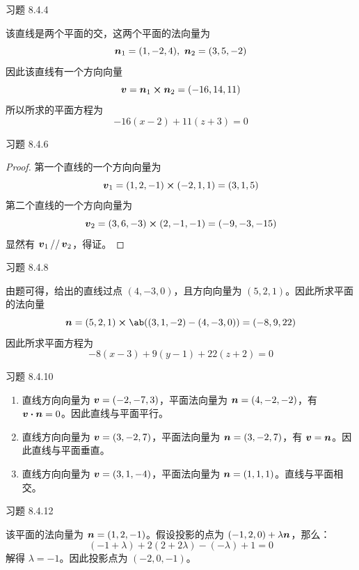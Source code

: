 \begin{problem}
    习题 8.4.4
    \begin{solution}
        该直线是两个平面的交，这两个平面的法向量为
        $$
        \boldsymbol{n}_1 = (1, -2, 4),\ \boldsymbol{n}_2 = (3, 5, -2)
        $$
        因此该直线有一个方向向量
        $$
        \vect{v} = \vect{n}_1 \cp \vect{n}_2 = (-16, 14, 11)
        $$
        所以所求的平面方程为
        $$
        -16 (x - 2) + 11 (z + 3) = 0
        $$
    \end{solution}
\end{problem}

\begin{problem}
    习题 8.4.6
    \begin{proof}
        第一个直线的一个方向向量为
        $$
        \vect{v}_1 = (1, 2, -1) \cp (-2, 1, 1) = (3, 1, 5)
        $$
        第二个直线的一个方向向量为
        $$
        \vect{v}_2 = (3, 6, -3) \cp (2, -1, -1) = (-9, -3, -15)
        $$
        显然有 $\boldsymbol{v}_1 \operatorname{//} \boldsymbol{v}_2$，得证。
    \end{proof}
\end{problem}

\begin{problem}
    习题 8.4.8
    \begin{solution}
        由题可得，给出的直线过点 $(4, -3, 0)$，且方向向量为 $(5, 2, 1)$。因此所求平面的法向量
        $$
        \vect{n} = (5, 2, 1) \cp \ab((3, 1, -2) - (4, -3, 0)) = (-8, 9, 22)
        $$
        因此所求平面方程为
        $$
        -8 (x - 3) + 9 (y - 1) + 22 (z + 2) = 0
        $$
    \end{solution}
\end{problem}

\begin{problem}
    习题 8.4.10
    \begin{solution}
        \begin{enumerate}
            \item[\textbf{1)}] 直线方向向量为 $\boldsymbol{v} = (-2, -7, 3)$，平面法向量为 $\boldsymbol{n} = (4, -2, -2)$，有 $\vect{v} \vdot \vect{n} = 0$。因此直线与平面平行。
            \item[\textbf{2)}] 直线方向向量为 $\boldsymbol{v} = (3, -2, 7)$，平面法向量为 $\boldsymbol{n} = (3, -2, 7)$，有 $\boldsymbol{v} = \boldsymbol{n}$。因此直线与平面垂直。
            \item[\textbf{3)}] 直线方向向量为 $\boldsymbol{v} = (3, 1, -4)$，平面法向量为 $\boldsymbol{n} = (1, 1, 1)$。直线与平面相交。
        \end{enumerate}
    \end{solution}
\end{problem}

\begin{problem}
    习题 8.4.12
    \begin{solution}
        该平面的法向量为 $\boldsymbol{n} = (1, 2, -1)$。假设投影的点为 $(-1, 2, 0) + \lambda \boldsymbol{n}$，那么：
        $$
        (-1 + \lambda) + 2 (2 + 2 \lambda) - (-\lambda) + 1 = 0
        $$
        解得 $\lambda = -1$。因此投影点为 $(-2, 0, -1)$。
    \end{solution}
\end{problem}
